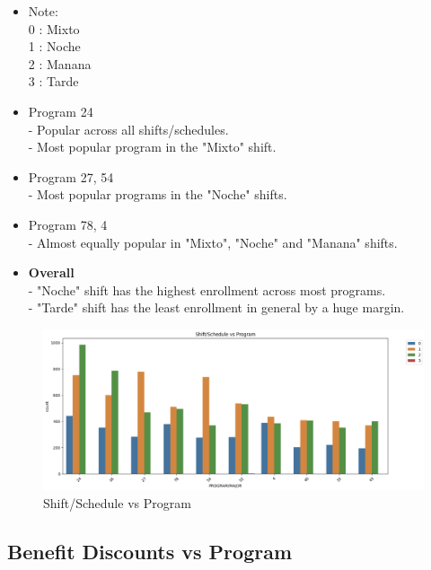 \documentclass[12pt]{article}
\begin{document}
\begin{itemize}
    \item Note:\\
    0 : Mixto\\
    1 : Noche\\
    2 : Manana\\
    3 : Tarde
    
    \item Program 24\\
    - Popular across all shifts/schedules.\\
    - Most popular program in the "Mixto" shift.

    \item Program 27, 54\\
    - Most popular programs in the "Noche" shifts.

    \item Program 78, 4\\
    - Almost equally popular in "Mixto", "Noche" and "Manana" shifts.

    \item \textbf{Overall}\\
    - "Noche" shift has the highest enrollment across most programs.\\
    - "Tarde" shift has the least enrollment in general by a huge margin.
\end{itemize}

\begin{figure}[H]
    \centering
    \includegraphics[width=1\linewidth]{shift:schedule.png}
    \caption{Shift/Schedule vs Program}
\end{figure}

\subsection{Benefit Discounts vs Program}
\end{document}
